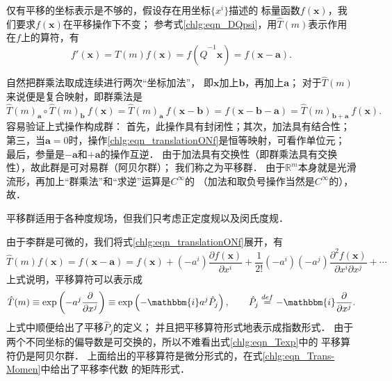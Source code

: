 仅有平移的坐标表示是不够的，假设存在用坐标$\{x^i\}$描述的
标量函数$f(\boldsymbol{x})$，我们要求$f(\boldsymbol{x})$在平移操作下不变；
参考式\eqref{chlg:eqn_DQpsi}，用$\hat{T}(m)$表示作用在$f$上的算符，有
\begin{equation}\label{chlg:eqn_translationONf}
    f'(\boldsymbol{x})=\hat{T}(m) f(\boldsymbol{x})= f(\hat{Q}^{-1}\boldsymbol{x}) = f(\boldsymbol{x} - \boldsymbol{a}) .
\end{equation}


自然把群乘法取成连续进行两次“坐标加法”，
即$\boldsymbol{x}$加上$\boldsymbol{b}$，再加上$\boldsymbol{a}$；
对于$\hat{T}(m)$来说便是复合映射，即群乘法是
\begin{equation*}
    \hat{T}(m)_{\boldsymbol{a}}\circ \hat{T}(m)_{\boldsymbol{b}}\ f(\boldsymbol{x}) 
    = \hat{T}(m)_{\boldsymbol{a}}\ f(\boldsymbol{x} - \boldsymbol{b}) 
    = f(\boldsymbol{x} - \boldsymbol{b} - \boldsymbol{a}) 
    = \hat{T}(m)_{\boldsymbol{b}+ \boldsymbol{a}}\ f(\boldsymbol{x}) .
\end{equation*}
容易验证上式操作构成群：
首先，此操作具有封闭性；其次，加法具有结合性；
第三，当$\boldsymbol{a}=0$时，操作\eqref{chlg:eqn_translationONf}是恒等映射，可看作单位元；
最后，参量是$-\boldsymbol{a}$和$+\boldsymbol{a}$的操作互逆．
由于加法具有交换性（即群乘法具有交换性），故此群是可对易群（阿贝尔群）；
我们称之为{\heiti 平移群}．
由于$\mathbb{R}^m$本身就是光滑流形，再加上“群乘法”和“求逆”运算是$C^\infty$的
（加法和取负号操作当然是$C^\infty$的），故．

平移群适用于各种度规场，但我们只考虑正定度规以及闵氏度规．

由于李群是可微的，我们将式\eqref{chlg:eqn_translationONf}展开，有
\begin{equation*}
    \hat{T}(m) f(\boldsymbol{x}) = f(\boldsymbol{x} - \boldsymbol{a}) 
    = f(\boldsymbol{x}) + (-a^i) \frac{\partial f(\boldsymbol{x})}{\partial x^i}
    +\frac{1}{2!} (-a^i)(-a^j) \frac{\partial^2 f(\boldsymbol{x})}{\partial x^i \partial x^j}
    +\cdots 
\end{equation*}
上式说明，平移算符可以表示成
\begin{equation}\label{chlg:eqn_Texp}
    \hat{T}(m) \equiv \exp\left( -a^j \frac{\partial }{\partial x^j} \right) 
    \equiv\exp\left(-\mathbbm{i} a^j \hat{P}_j  \right) , \qquad
    \hat{P}_j\overset{def}{=} -\mathbbm{i}\frac{\partial }{\partial x^j} .
\end{equation}
上式中顺便给出了平移$\hat{P}_j$的定义；
并且把平移算符形式地表示成指数形式．
由于两个不同坐标的偏导数是可交换的，所以不难看出式\eqref{chlg:eqn_Texp}中的
平移算符仍是阿贝尔群．
上面给出的平移算符是微分形式的，在式\eqref{chlg:eqn_Trans-Momen}中给出了平移李代数
的矩阵形式．

